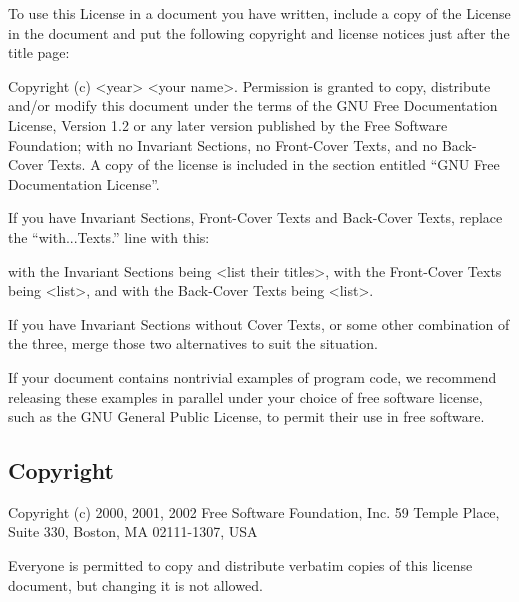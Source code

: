 {\tiny{}To use this License in a document you have written, include
a copy of the License in the document and put the following copyright
and license notices just after the title page:}{\tiny\par}

{\tiny{}Copyright (c) <year> <your name>. Permission is granted to
copy, distribute and/or modify this document under the terms of the
GNU Free Documentation License, Version 1.2 or any later version published
by the Free Software Foundation; with no Invariant Sections, no Front-Cover
Texts, and no Back-Cover Texts. A copy of the license is included
in the section entitled “GNU Free Documentation License”.}{\tiny\par}

{\tiny{}If you have Invariant Sections, Front-Cover Texts and Back-Cover
Texts, replace the “with...Texts.” line with this:}{\tiny\par}

{\tiny{}with the Invariant Sections being <list their titles>, with
the Front-Cover Texts being <list>, and with the Back-Cover Texts
being <list>.}{\tiny\par}

{\tiny{}If you have Invariant Sections without Cover Texts, or some
other combination of the three, merge those two alternatives to suit
the situation.}{\tiny\par}

{\tiny{}If your document contains nontrivial examples of program code,
we recommend releasing these examples in parallel under your choice
of free software license, such as the GNU General Public License,
to permit their use in free software.}{\tiny\par}

\subsection*{{\tiny{}Copyright }}

{\tiny{}Copyright (c) 2000, 2001, 2002 Free Software Foundation, Inc.
59 Temple Place, Suite 330, Boston, MA 02111-1307, USA}{\tiny\par}

{\tiny{}Everyone is permitted to copy and distribute verbatim copies
of this license document, but changing it is not allowed.}{\tiny\par}
